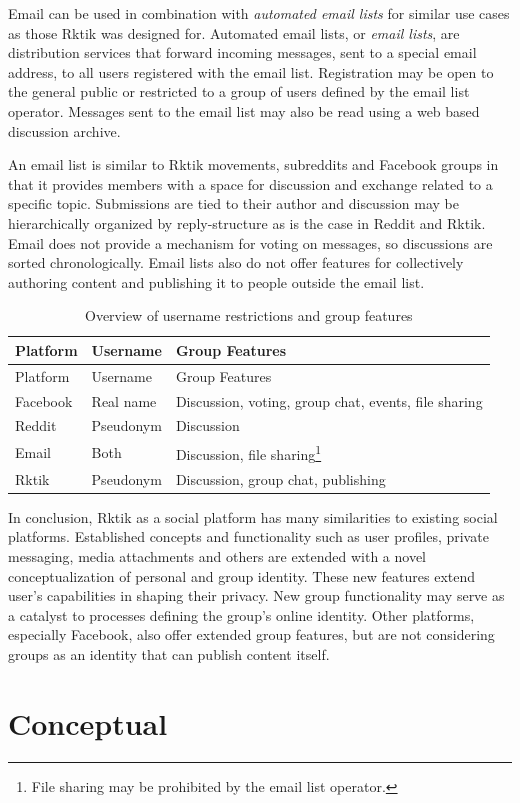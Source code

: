 Email can be used in combination with \emph{automated email lists} for
similar use cases as those Rktik was designed for. Automated email
lists, or \emph{email lists}, are distribution services that forward
incoming messages, sent to a special email address, to all users
registered with the email list. Registration may be open to the general
public or restricted to a group of users defined by the email list
operator. Messages sent to the email list may also be read using a web
based discussion archive.

An email list is similar to Rktik movements, subreddits and Facebook
groups in that it provides members with a space for discussion and
exchange related to a specific topic. Submissions are tied to their
author and discussion may be hierarchically organized by reply-structure
as is the case in Reddit and Rktik. Email does not provide a mechanism
for voting on messages, so discussions are sorted chronologically. Email
lists also do not offer features for collectively authoring content and
publishing it to people outside the email list.

\begin{longtable}[c]{@{}lll@{}}
\caption{Overview of username restrictions and group
features}\tabularnewline
\toprule
Platform & Username & Group Features\tabularnewline
\midrule
\endfirsthead
\toprule
Platform & Username & Group Features\tabularnewline
\midrule
\endhead
Facebook & Real name & Discussion, voting, group chat, events, file
sharing\tabularnewline
Reddit & Pseudonym & Discussion\tabularnewline
Email & Both & Discussion, file sharing\footnote{File sharing may be
  prohibited by the email list operator.}\tabularnewline
Rktik & Pseudonym & Discussion, group chat, publishing\tabularnewline
\bottomrule
\end{longtable}

In conclusion, Rktik as a social platform has many similarities to
existing social platforms. Established concepts and functionality such
as user profiles, private messaging, media attachments and others are
extended with a novel conceptualization of personal and group identity.
These new features extend user's capabilities in shaping their privacy.
New group functionality may serve as a catalyst to processes defining
the group's online identity. Other platforms, especially Facebook, also
offer extended group features, but are not considering groups as an
identity that can publish content itself.

\chapter{Conceptual}\label{conceptual}

